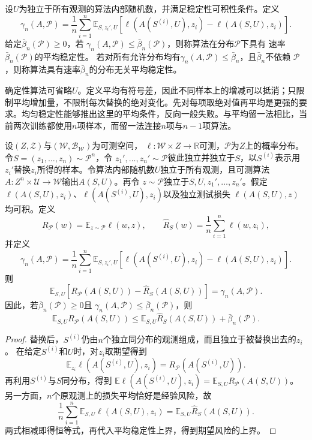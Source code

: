 \begin{definition}[平均稳定性]
\label{def:on-average-stability}
设$U$为独立于所有观测的算法内部随机数，并满足稳定性可积性条件。定义
\begin{equation}
 \gamma_n(A,\mathcal P)
 =\frac1n\sum_{i=1}^n\mathbb E_{S,z_i',U}
 \left[\ell(A(S^{(i)},U),z_i)-\ell(A(S,U),z_i)\right].
 \label{eq:on-average-stability}
\end{equation}
给定$\bar\beta_n(\mathcal P)\geq0$，若
$\gamma_n(A,\mathcal P)\leq\bar\beta_n(\mathcal P)$，则称算法在分布$\mathcal P$下具有
速率$\bar\beta_n(\mathcal P)$的平均稳定性。
若对所有允许分布均有$\gamma_n(A,\mathcal P)\leq\bar\beta_n$，且$\bar\beta_n$不依赖
$\mathcal P$，则称算法具有速率$\bar\beta_n$的分布无关平均稳定性。
\end{definition}

确定性算法可省略$U$。定义平均有符号差，因此不同样本上的增减可以抵消；只限制平均增加量，不限制每次替换的绝对变化。先对每项取绝对值再平均是更强的要求。均匀稳定性能够推出这里的平均条件，反向一般失败。与平均留一法相比，当前两次训练都使用$n$项样本，而留一法连接$n$项与$n-1$项算法。

\begin{theorem}[平均稳定性与期望风险]
\label{thm:on-average-generalization}
设$(Z,\mathcal Z)$与$(\mathcal W,\mathcal B_{\mathcal W})$为可测空间，
$\ell:\mathcal W\times Z\to\mathbb R$可测，$\mathcal P$为$Z$上的概率分布。
令$S=(z_1,\ldots,z_n)\sim\mathcal P^n$，令
$z_1',\ldots,z_n'\sim\mathcal P$彼此独立并独立于$S$，以$S^{(i)}$表示用
$z_i'$替换$z_i$所得的样本。令算法内部随机数$U$独立于所有观测，且可测算法
$A:Z^n\times\mathcal U\to\mathcal W$输出$A(S,U)$。再令
$z\sim\mathcal P$独立于$S,U,z_1',\ldots,z_n'$。假定
$\ell(A(S,U),z_i)$、$\ell(A(S^{(i)},U),z_i)$以及独立测试损失
$\ell(A(S,U),z)$均可积。定义
\[
 R_{\mathcal P}(w)=\mathbb E_{z\sim\mathcal P}\ell(w,z),
 \qquad
 \hat R_S(w)=\frac1n\sum_{i=1}^n\ell(w,z_i),
\]
并定义
\[
 \gamma_n(A,\mathcal P)
 =\frac1n\sum_{i=1}^n\mathbb E_{S,z_i',U}
 \left[\ell(A(S^{(i)},U),z_i)-\ell(A(S,U),z_i)\right].
\]
则
\begin{equation}
 \mathbb E_{S,U}\left[R_{\mathcal P}(A(S,U))-\hat R_S(A(S,U))\right]
 =\gamma_n(A,\mathcal P).
 \label{eq:on-average-generalization-identity}
\end{equation}
因此，若$\bar\beta_n(\mathcal P)\geq0$且
$\gamma_n(A,\mathcal P)\leq\bar\beta_n(\mathcal P)$，则
\[
 \mathbb E_{S,U}R_{\mathcal P}(A(S,U))
 \leq\mathbb E_{S,U}\hat R_S(A(S,U))+\bar\beta_n(\mathcal P).
\]
\end{theorem}
\begin{proof}
替换后，$S^{(i)}$仍由$n$个独立同分布的观测组成，而且独立于被替换出去的$z_i$。
在给定$S^{(i)}$和$U$时，对$z_i$取期望得到
\[
 \mathbb E_{z_i}\ell(A(S^{(i)},U),z_i)
 =R_{\mathcal P}(A(S^{(i)},U)).
\]
再利用$S^{(i)}$与$S$同分布，得到
$\mathbb E\ell(A(S^{(i)},U),z_i)=\mathbb E_{S,U}R_{\mathcal P}(A(S,U))$。
另一方面，$n$个原观测上的损失平均恰好是经验风险，故
\[
 \frac1n\sum_{i=1}^n\mathbb E_{S,U}\ell(A(S,U),z_i)
 =\mathbb E_{S,U}\hat R_S(A(S,U)).
\]
两式相减即得恒等式，再代入平均稳定性上界，得到期望风险的上界。
\end{proof}

